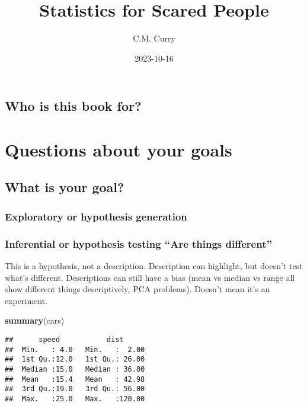 \documentclass[
]{book}
\title{Statistics for Scared People}
\author{C.M. Curry}
\date{2023-10-16}
\newenvironment{Shaded}{\begin{snugshade}}{\end{snugshade}}
\newcommand{\FunctionTok}[1]{\textcolor[rgb]{0.13,0.29,0.53}{\textbf{#1}}}
\newcommand{\NormalTok}[1]{#1}
\begin{document}
\maketitle

{
\setcounter{tocdepth}{1}
\tableofcontents
}
\hypertarget{who-is-this-book-for}{%
\chapter*{Who is this book for?}\label{who-is-this-book-for}}

\hypertarget{part-questions-about-your-goals}{%
\part{Questions about your goals}\label{part-questions-about-your-goals}}

\hypertarget{what-is-your-goal}{%
\chapter{What is your goal?}\label{what-is-your-goal}}

\hypertarget{exploratory-or-hypothesis-generation}{%
\section{Exploratory or hypothesis generation}\label{exploratory-or-hypothesis-generation}}

\hypertarget{inferential-or-hypothesis-testing-are-things-different}{%
\section{Inferential or hypothesis testing ``Are things different''}\label{inferential-or-hypothesis-testing-are-things-different}}

This is a hypothesis, not a description. Description can highlight, but doesn't test what's different. Descriptions can still have a bias (mean vs median vs range all show different things descriptively, PCA problems). Doesn't mean it's an experiment.

\begin{Shaded}
\begin{Highlighting}[]
\FunctionTok{summary}\NormalTok{(cars)}
\end{Highlighting}
\end{Shaded}

\begin{verbatim}
##      speed           dist       
##  Min.   : 4.0   Min.   :  2.00  
##  1st Qu.:12.0   1st Qu.: 26.00  
##  Median :15.0   Median : 36.00  
##  Mean   :15.4   Mean   : 42.98  
##  3rd Qu.:19.0   3rd Qu.: 56.00  
##  Max.   :25.0   Max.   :120.00
\end{verbatim}
\end{document}
